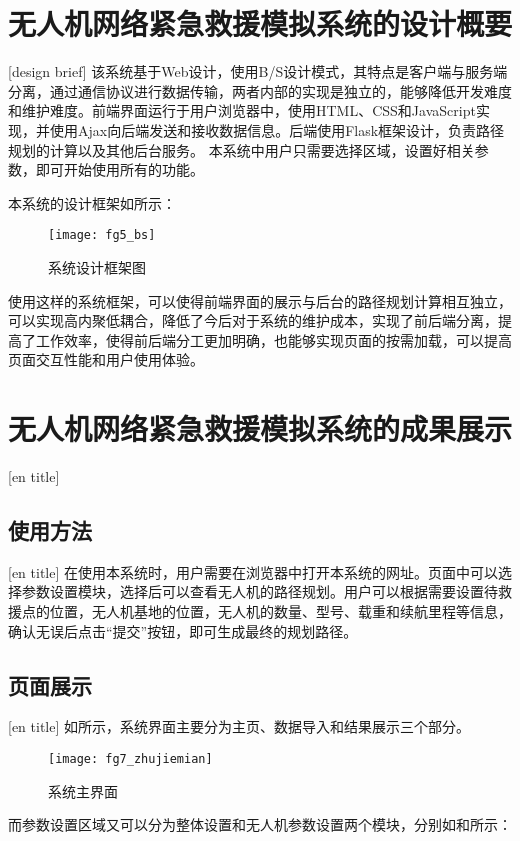 \section{无人机网络紧急救援模拟系统的设计概要}[design brief]
该系统基于Web设计，使用B/S设计模式，其特点是客户端与服务端分离，通过通信协议进行数据传输，两者内部的实现是独立的，能够降低开发难度和维护难度。前端界面运行于用户浏览器中，使用HTML、CSS和JavaScript实现，并使用Ajax向后端发送和接收数据信息。后端使用Flask框架设计，负责路径规划的计算以及其他后台服务。
本系统中用户只需要选择区域，设置好相关参数，即可开始使用所有的功能。


本系统的设计框架如所示：

\begin{figure}[ht]
	\centering
	\texttt{[image: fg5\_bs]}
	\caption{系统设计框架图}
	\label{fg601}
\end{figure}


使用这样的系统框架，可以使得前端界面的展示与后台的路径规划计算相互独立，可以实现高内聚低耦合，降低了今后对于系统的维护成本，实现了前后端分离，提高了工作效率，使得前后端分工更加明确，也能够实现页面的按需加载，可以提高页面交互性能和用户使用体验。

\section{无人机网络紧急救援模拟系统的成果展示}[en title]
\subsection{使用方法}[en title]
在使用本系统时，用户需要在浏览器中打开本系统的网址。页面中可以选择参数设置模块，选择后可以查看无人机的路径规划。用户可以根据需要设置待救援点的位置，无人机基地的位置，无人机的数量、型号、载重和续航里程等信息，确认无误后点击“提交”按钮，即可生成最终的规划路径。
\subsection{页面展示}[en title]
如所示，系统界面主要分为主页、数据导入和结果展示三个部分。

\begin{figure}[H]
	\centering
	\texttt{[image: fg7\_zhujiemian]}
	\caption{系统主界面}
	\label{fg602}
\end{figure}
而参数设置区域又可以分为整体设置和无人机参数设置两个模块，分别如和所示：

